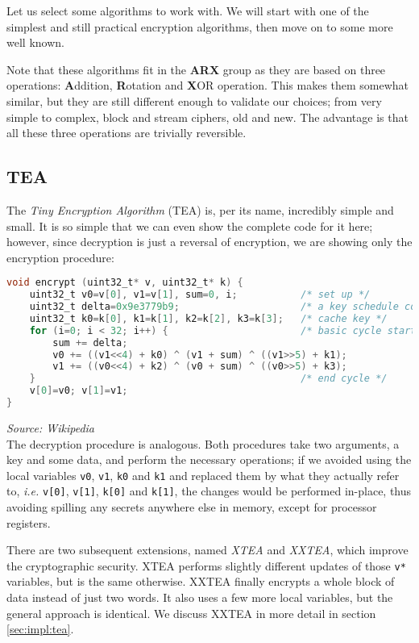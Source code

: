\documentclass[a4paper,10pt,openright]{memoir}
\newcommand{\ie}{\emph{i.e.}\xspace}
\newcommand{\term}[1]{\textit{#1}}
\newcommand{\code}[1]{\texttt{#1}}
\begin{document}
Let us select some algorithms to work with. We will start with one of 
the simplest and still practical encryption algorithms, then move on to 
some more well known.

Note that these algorithms fit in the \textbf{ARX} group as they are 
based on three operations: \textbf{A}ddition, \textbf{R}otation and 
\textbf{X}OR operation. This makes them somewhat similar, but they are 
still different enough to validate our choices; from very simple to 
complex, block and stream ciphers, old and new. The advantage is that 
all these three operations are trivially reversible.

\subsection{TEA}

The \term{Tiny Encryption Algorithm} (TEA)\cite{tea95} is, per its 
name, incredibly simple and small. It is so simple that we can even 
show the complete code for it here; however, since decryption is just a 
reversal of encryption, we are showing only the encryption procedure:

\begin{lstlisting}[language=C]
void encrypt (uint32_t* v, uint32_t* k) {
    uint32_t v0=v[0], v1=v[1], sum=0, i;           /* set up */
    uint32_t delta=0x9e3779b9;                     /* a key schedule constant */
    uint32_t k0=k[0], k1=k[1], k2=k[2], k3=k[3];   /* cache key */
    for (i=0; i < 32; i++) {                       /* basic cycle start */
        sum += delta;
        v0 += ((v1<<4) + k0) ^ (v1 + sum) ^ ((v1>>5) + k1);
        v1 += ((v0<<4) + k2) ^ (v0 + sum) ^ ((v0>>5) + k3);
    }                                              /* end cycle */
    v[0]=v0; v[1]=v1;
}
\end{lstlisting}
\textit{\footnotesize Source: Wikipedia}\\

The decryption procedure is analogous. Both procedures take two 
arguments, a key and some data, and perform the necessary operations; 
if we avoided using the local variables \code{v0}, \code{v1}, \code{k0} 
and \code{k1} and replaced them by what they actually refer to, \ie 
\code{v[0]}, \code{v[1]}, \code{k[0]} and \code{k[1]}, the changes 
would be performed in-place, thus avoiding spilling any secrets 
anywhere else in memory, except for processor registers.

There are two subsequent extensions, named \term{XTEA} and 
\term{XXTEA}, which improve the cryptographic security. XTEA performs 
slightly different updates of those \code{v*} variables, but is the 
same otherwise. XXTEA finally encrypts a whole block of data instead of 
just two words. It also uses a few more local variables, but the 
general approach is identical. We discuss XXTEA in more detail in 
section \ref{sec:impl:tea}.
\end{document}
